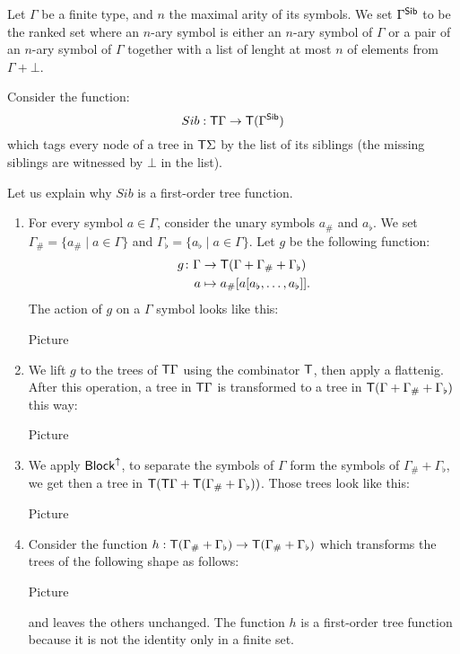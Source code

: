 \bigskip
\noindent \begin{example}
Let $\Gamma$ be a finite type, and $n$ the maximal arity of its symbols. We set $\Gamma^{\sf{Sib}}$ to be the ranked set where an $n$-ary symbol is either an $n$-ary symbol of $\Gamma$ or a pair of an $n$-ary symbol of $\Gamma$ together with a list of lenght at most $n$ of elements from $\Gamma+\bot$. %

\medskip
Consider the function:
\[ Sib: \mathsf T \Gamma \to \mathsf T (\Gamma^{\mathsf{Sib}})\]
which tags every node of a tree in $\mathsf T \Sigma$ by the list of its siblings (the missing siblings are witnessed by $\bot$ in the list).

Let us explain why $Sib$ is a first-order tree function. 
\begin{enumerate}
\item For every symbol $a\in \Gamma$, consider the unary symbols $a_\#$ and $a_\flat$.
We set $\Gamma_\#=\{a_\#\mid a\in\Gamma\}$ and $\Gamma_\flat=\{a_\flat\mid a\in\Gamma\}$.
Let $g$ be the following function:
 \begin{align*}
  g\colon \Gamma &\to \mathsf T(\Gamma+\Gamma_\#+\Gamma_\flat)\\
  a &\mapsto a_\#[a[a_\flat,\dots,a_\flat]].
\end{align*}
The action of $g$ on a $\Gamma$ symbol looks like this:
\begin{center}
Picture
\end{center}
\item We lift $g$ to the trees of $\mathsf T \Gamma$ using the combinator $\mathsf T$, then apply a flattenig. After this operation, a tree in $\mathsf T\Gamma$ is transformed to a tree in $\mathsf T(\Gamma+\Gamma_\#+\Gamma_\flat)$ this way:
\begin{center}
Picture
\end{center}
\item We apply $\sf{Block}^{\uparrow}$, to separate the symbols of $\Gamma$ form the symbols of $\Gamma_\#+\Gamma_\flat$, we get then a tree in $\mathsf T(\mathsf T\Gamma+\mathsf T(\Gamma_\#+\Gamma_\flat))$. Those trees look like this:
\begin{center}
Picture
\end{center}
\item Consider the function $h:\mathsf T(\Gamma_\#+\Gamma_\flat)\to \mathsf T(\Gamma_\#+\Gamma_\flat)$ which transforms the trees of the following shape as follows:
\begin{center}
Picture
\end{center}
and leaves the others unchanged. 
The function $h$ is a first-order tree function because it is not the identity only in a finite set.


\end{enumerate}
\end{example}
